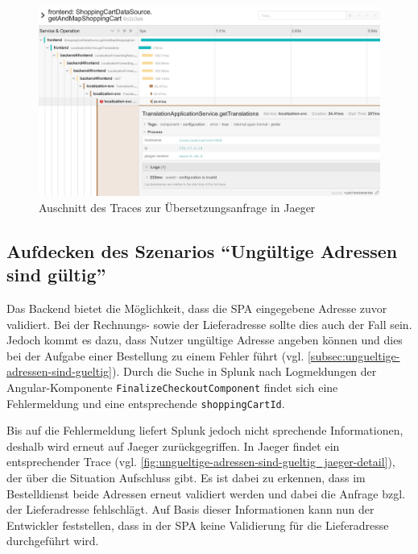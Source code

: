 \begin{figure}[H]
	\centering
	\includegraphics[width=1.00\linewidth]{img/05_ergebnis/keine-uebersetzungen_jaeger_detail.png}
	\caption{Auschnitt des Traces zur Übersetzungsanfrage in Jaeger}
	\label{fig:keine-uebersetzungen_jaeger_detail}
\end{figure}

\subsection{Aufdecken des Szenarios \enquote{Ungültige Adressen sind gültig}}

Das Backend bietet die Möglichkeit, dass die SPA eingegebene Adresse zuvor validiert. Bei der Rechnungs- sowie der Lieferadresse sollte dies auch der Fall sein. Jedoch kommt es dazu, dass Nutzer ungültige Adresse angeben können und dies bei der Aufgabe einer Bestellung zu einem Fehler führt (vgl. \autoref{subsec:ungueltige-adressen-sind-gueltig}). Durch die Suche in Splunk nach Logmeldungen der Angular-Komponente \texttt{Finalize\-Checkout\-Component} findet sich eine Fehlermeldung und eine entsprechende \texttt{shopping\-Cart\-Id}.

Bis auf die Fehlermeldung liefert Splunk jedoch nicht sprechende Informationen, deshalb wird erneut auf Jaeger zurückgegriffen. In Jaeger findet ein entsprechender Trace (vgl. \autoref{fig:ungueltige-adressen-sind-gueltig_jaeger-detail}), der über die Situation Aufschluss gibt. Es ist dabei zu erkennen, dass im Bestelldienst beide Adressen erneut validiert werden und dabei die Anfrage bzgl. der Lieferadresse fehlschlägt. Auf Basis dieser Informationen kann nun der Entwickler feststellen, dass in der SPA keine Validierung für die Lieferadresse durchgeführt wird.

